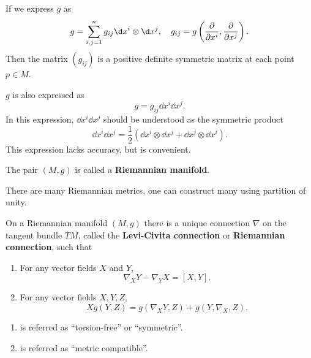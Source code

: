 \documentclass[12pt]{article}
\begin{document}
If we express \(g\) as \[
    g=\sum_{i,j=1}^{n}g_{ij}\dd{x^i}\otimes \dd{x^j},\quad
    g_{ij}=g\left(\pd{x^i},\pd{x^j}\right)
.\] Then the matrix \((g_{ij})\) is a positive definite symmetric matrix at each point
\(p\in M\).

\(g\) is  also expressed as \[
    g=g_{ij}\dd{x^i}\dd{x^j}
.\] In this expression, \(\dd{x^i}\dd{x^j}\) should be understood as the symmetric
product \[
    \dd{x^i}\dd{x^j}=\frac{1}{2}(\dd{x^i}\otimes \dd{x^j}+\dd{x^j}\otimes \dd{x^i})
.\] This expression lacks accuracy, but is convenient.

\begin{definition}
    The pair \((M,g)\) is called a \textbf{Riemannian manifold}.
\end{definition}
There are many Riemannian metrics, one can construct many using partition of unity.

\begin{theorem}
    On a Riemannian manifold \((M,g)\) there is a unique connection \(\nabla\) on
    the tangent bundle \(TM\), called the \textbf{Levi-Civita connection} or \textbf{
    Riemannian connection}, such that
    \begin{enumerate}[(1)]
    \item For any vector fields \(X\) and \(Y\), \[
        \nabla_X Y-\nabla_Y X=[X,Y]
    .\] 
    \item For any vector fields \(X,Y,Z\), \[
        Xg(Y,Z)=g(\nabla_X Y,Z)+g(Y,\nabla_X,Z)
    .\] 
    \end{enumerate}
\end{theorem}
\begin{remark}\hfill
\begin{enumerate}[(1)]
    \item is referred as ``torsion-free'' or ``symmetric''.
    \item is referred as ``metric compatible''.
\end{enumerate}
\end{remark}
\end{document}
